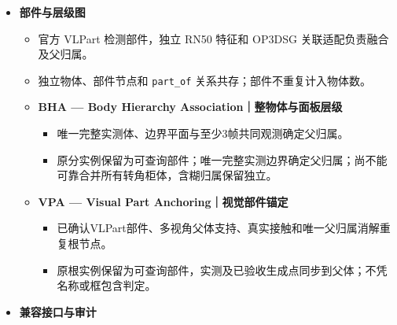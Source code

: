 \documentclass[UTF8,fontset=fandol]{ctexart}
\begin{document}
\begin{itemize}
\begin{itemize}
\begin{itemize}
\item 沿用 ScanNet-SG 原始建图根基；临时物体图为后续部件父归属提供接口。


\item 最终用同一正式点云重算物体框、中心及空间边，不直接修改成品来提高分数。


\item \textbf{PCB — Physical Cue Boxes｜物理表面定向框}：优先两个广阔正交实测面；末段可用可靠竖直单面提供方向，原点极值提供尺寸，证据不足回退原求解器。

\end{itemize}

\item \textbf{部件与层级图}


\begin{itemize}
\item 官方 VLPart 检测部件，独立 RN50 特征和 OP3DSG 关联适配负责融合及父归属。


\item 独立物体、部件节点和 \texttt{part\_\allowbreak{}of} 关系共存；部件不重复计入物体数。


\item \textbf{BHA — Body Hierarchy Association｜整物体与面板层级}


\begin{itemize}
\item 唯一完整实测体、边界平面与至少3帧共同观测确定父归属。


\item 原分实例保留为可查询部件；唯一完整实测边界确定父归属；尚不能可靠合并所有转角柜体，含糊归属保留独立。

\end{itemize}

\item \textbf{VPA — Visual Part Anchoring｜视觉部件锚定}


\begin{itemize}
\item 已确认VLPart部件、多视角父体支持、真实接触和唯一父归属消解重复根节点。


\item 原根实例保留为可查询部件，实测及已验收生成点同步到父体；不凭名称或框包含判定。

\end{itemize}
\end{itemize}

\item \textbf{兼容接口与审计}



\end{itemize}
\end{itemize}
\end{document}
